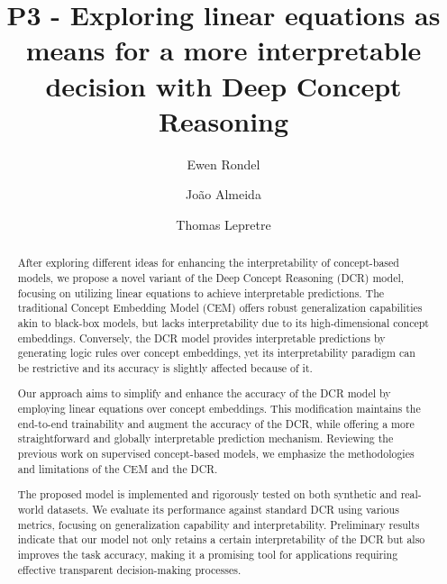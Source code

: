 \documentclass[sigconf, nonacm]{acmart}
\begin{document}
\title{P3 - Exploring linear equations as means for a more interpretable decision with Deep Concept Reasoning}


\author{Ewen Rondel}

\author{João Almeida}
\author{Thomas Lepretre}



\begin{abstract}
\vspace{2pt}
After exploring different ideas for enhancing the interpretability of concept-based models, we propose a novel variant of the Deep Concept Reasoning (DCR) \cite{barbiero2023interpretable} model, focusing on utilizing linear equations to achieve interpretable predictions. The traditional Concept Embedding Model (CEM) \cite{espinosa2022concept} offers robust generalization capabilities akin to black-box models, but lacks interpretability due to its high-dimensional concept embeddings. Conversely, the DCR model provides interpretable predictions by generating logic rules over concept embeddings, yet its interpretability paradigm can be restrictive and its accuracy is slightly affected because of it.

Our approach aims to simplify and enhance the accuracy of the DCR model by employing linear equations over concept embeddings. This modification maintains the end-to-end trainability and augment the accuracy of the DCR, while offering a more straightforward and globally interpretable prediction mechanism. Reviewing the previous work on supervised concept-based models, we emphasize the methodologies and limitations of the CEM and the DCR.

The proposed model is implemented and rigorously tested on both synthetic and real-world datasets. We evaluate its performance against standard DCR using various metrics, focusing on generalization capability and interpretability. Preliminary results indicate that our model not only retains a certain interpretability of the DCR but also improves the task accuracy, making it a promising tool for applications requiring effective transparent decision-making processes.
\end{abstract}
\end{document}
